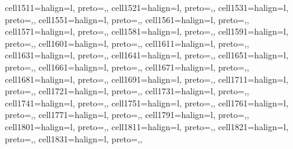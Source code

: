 \begin{table}
\begin{talltblr}[         %
caption={Technology Adoption Models:  Germany},
note{}={* p \num{< 0.1}, ** p \num{< 0.05}, *** p \num{< 0.01}},
note{ }={* p < 0.1, ** p < 0.05, *** p < 0.01},
]
{cell{151}{1}={}{halign=l, preto={\hspace{1em}},},
cell{152}{1}={}{halign=l, preto={\hspace{1em}},},
cell{153}{1}={}{halign=l, preto={\hspace{1em}},},
cell{155}{1}={}{halign=l, preto={\hspace{1em}},},
cell{156}{1}={}{halign=l, preto={\hspace{1em}},},
cell{157}{1}={}{halign=l, preto={\hspace{1em}},},
cell{158}{1}={}{halign=l, preto={\hspace{1em}},},
cell{159}{1}={}{halign=l, preto={\hspace{1em}},},
cell{160}{1}={}{halign=l, preto={\hspace{1em}},},
cell{161}{1}={}{halign=l, preto={\hspace{1em}},},
cell{163}{1}={}{halign=l, preto={\hspace{1em}},},
cell{164}{1}={}{halign=l, preto={\hspace{1em}},},
cell{165}{1}={}{halign=l, preto={\hspace{1em}},},
cell{166}{1}={}{halign=l, preto={\hspace{1em}},},
cell{167}{1}={}{halign=l, preto={\hspace{1em}},},
cell{168}{1}={}{halign=l, preto={\hspace{1em}},},
cell{169}{1}={}{halign=l, preto={\hspace{1em}},},
cell{171}{1}={}{halign=l, preto={\hspace{1em}},},
cell{172}{1}={}{halign=l, preto={\hspace{1em}},},
cell{173}{1}={}{halign=l, preto={\hspace{1em}},},
cell{174}{1}={}{halign=l, preto={\hspace{1em}},},
cell{175}{1}={}{halign=l, preto={\hspace{1em}},},
cell{176}{1}={}{halign=l, preto={\hspace{1em}},},
cell{177}{1}={}{halign=l, preto={\hspace{1em}},},
cell{179}{1}={}{halign=l, preto={\hspace{1em}},},
cell{180}{1}={}{halign=l, preto={\hspace{1em}},},
cell{181}{1}={}{halign=l, preto={\hspace{1em}},},
cell{182}{1}={}{halign=l, preto={\hspace{1em}},},
cell{183}{1}={}{halign=l, preto={\hspace{1em}},},
}
\end{talltblr}
\end{table}
